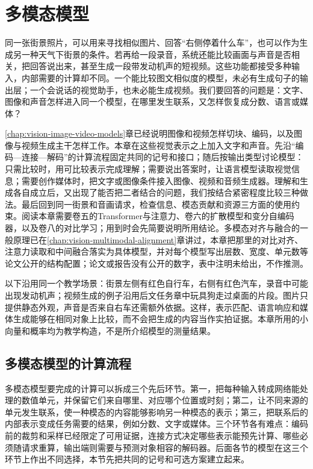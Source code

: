 \chapter{多模态模型}
\label{chap:vision-multimodal-models}

同一张街景照片，可以用来寻找相似图片、回答“右侧停着什么车”，也可以作为生成另一种天气下街景的条件。若再给一段录音，系统还能比较画面与声音是否相关，把回答说出来，甚至生成一段带发动机声的短视频。这些功能都接受多种输入，内部需要的计算却不同。一个能比较图文相似度的模型，未必有生成句子的输出层；一个会说话的视觉助手，也未必能生成视频。我们要回答的问题是：文字、图像和声音怎样进入同一个模型，在哪里发生联系，又怎样恢复成分数、语言或媒体？

\ref{chap:vision-image-video-models}章已经说明图像和视频怎样切块、编码，以及图像与视频生成主干怎样工作。本章在这些视觉表示之上加入文字和声音。先沿“编码—连接—解码”的计算流程固定共同的记号和接口；随后按输出类型讨论模型：只需比较时，用可比较表示完成理解；需要说出答案时，让语言模型读取视觉信息；需要创作媒体时，把文字或图像条件接入图像、视频和音频生成器。理解和生成各自成立后，又出现了能否把二者结合的问题，我们按结合紧密程度比较三种做法。最后回到同一街景和音画请求，检查信息、模态贡献和资源三方面的使用约束。阅读本章需要卷五的Transformer与注意力、卷六的扩散模型和变分自编码器，以及卷八的对比学习；用到时会先简要说明所用结论。多模态对齐与融合的一般原理已在\ref{chap:vision-multimodal-alignment}章讲过，本章把那里的对比对齐、注意力读取和中间融合落实为具体模型，并对每个模型写出层数、宽度、单元数等论文公开的结构配置；论文或报告没有公开的数字，表中注明未给出，不作推测。

以下沿用同一个教学场景：街景左侧有红色自行车，右侧有红色汽车，录音中可能出现发动机声；视频生成的例子沿用后文任务章中玩具狗走过桌面的片段。图片只提供静态外观，声音是否来自右车还需额外依据。这样，表示匹配、语言响应和媒体生成能够在相同对象上比较，而不会把生成的内容当作实拍证据。本章所用的小向量和概率均为教学构造，不是所介绍模型的测量结果。

\section{多模态模型的计算流程}
\label{sec:vision-models-interfaces}

多模态模型要完成的计算可以拆成三个先后环节。第一，把每种输入转成网络能处理的数值单元，并保留它们来自哪里、对应哪个位置或时刻；第二，让不同来源的单元发生联系，使一种模态的内容能够影响另一种模态的表示；第三，把联系后的内部表示变成任务需要的结果，例如分数、文字或媒体。三个环节各有难点：编码前的裁剪和采样已经限定了可用证据，连接方式决定哪些表示能预先计算、哪些必须随请求重算，输出端则需要与预测对象相容的解码器。后面各节的模型在这三个环节上作出不同选择，本节先把共同的记号和可选方案建立起来。


